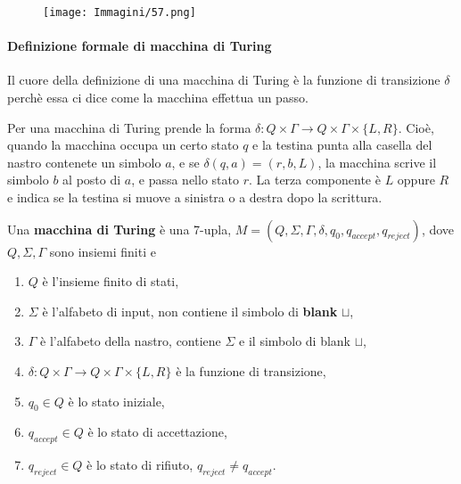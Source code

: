 \documentclass{article}
\begin{document}
\begin{figure}[H]
    \centering
    \texttt{[image: Immagini/57.png]}
    \label{fig:turing_machine_example}
\end{figure}

\paragraph{Definizione formale di macchina di Turing}
\label{def:turing_machine}
\text{ }

Il cuore della definizione di una macchina di Turing è la funzione di transizione $\delta$ perchè essa ci dice come la macchina effettua un passo.

Per una macchina di Turing prende la forma $\delta: Q \times \Gamma \rightarrow Q \times \Gamma \times \{L,R\}$.
Cioè, quando la macchina occupa un certo stato $q$ e la testina punta alla casella del nastro contenete un simbolo $a$, e se $\delta(q,a) = (r,b,L)$, la macchina scrive il simbolo $b$ al posto di $a$, e passa nello stato $r$.
La terza componente è $L$ oppure $R$ e indica se la testina si muove a sinistra o a destra dopo la scrittura.

\begin{tcolorbox}[colback=green!10!white, colframe=green!50!black, title=Definizione 3.3]
    Una \textbf{macchina di Turing} è una 7-upla, $M = (Q, \Sigma, \Gamma, \delta, q_0, q_{accept}, q_{reject})$, dove $Q, \Sigma, \Gamma$ sono insiemi finiti e
    \begin{enumerate}
        \item $Q$ è l'insieme finito di stati,
        \item $\Sigma$ è l'alfabeto di input, non contiene il simbolo di \textbf{blank} $\sqcup$,
        \item $\Gamma$ è l'alfabeto della nastro, contiene $\Sigma$ e il simbolo di blank $\sqcup$,
        \item $\delta: Q \times \Gamma \rightarrow Q \times \Gamma \times \{L,R\}$ è la funzione di transizione,
        \item $q_0 \in Q$ è lo stato iniziale,
        \item $q_{accept} \in Q$ è lo stato di accettazione,
        \item $q_{reject} \in Q$ è lo stato di rifiuto, $q_{reject} \neq q_{accept}$.
    \end{enumerate}
\end{tcolorbox}
\end{document}
